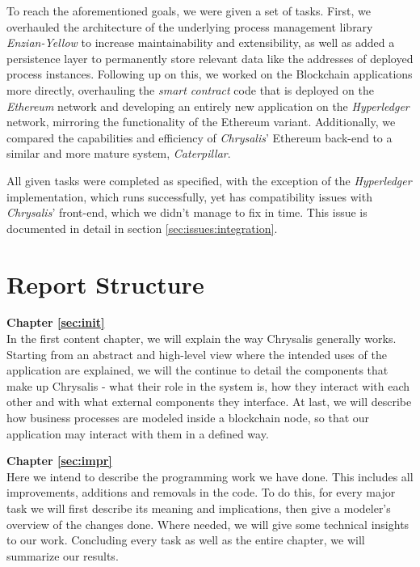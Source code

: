 To reach the aforementioned goals, we were given a set of tasks. First, we overhauled the architecture of the underlying process management library \emph{Enzian-Yellow} to increase maintainability and extensibility, as well as added a persistence layer to permanently store relevant data like the addresses of deployed process instances. Following up on this, we worked on the Blockchain applications more directly, overhauling the \emph{smart contract} code that is deployed on the \emph{Ethereum} network and developing an entirely new application on the \emph{Hyperledger} network, mirroring the functionality of the Ethereum variant. Additionally, we compared the capabilities and efficiency of \emph{Chrysalis}' Ethereum back-end to a similar and more mature system, \emph{Caterpillar}.

All given tasks were completed as specified, with the exception of the \emph{Hyperledger} implementation, which runs successfully, yet has compatibility issues with \emph{Chrysalis}' front-end, which we didn't manage to fix in time. This issue is documented in detail in section \ref{sec:issues:integration}.

\section{Report Structure}
\label{sec:intro:structure}

\textbf{Chapter \ref{sec:init}} \\[0.2em]
In the first content chapter, we will explain the way Chrysalis generally works. Starting from an abstract and high-level view where the intended uses of the application are explained, we will the continue to detail the components that make up Chrysalis - what their role in the system is, how they interact with each other and with what external components they interface. At last, we will describe how business processes are modeled inside a blockchain node, so that our application may interact with them in a defined way.

\textbf{Chapter \ref{sec:impr}} \\[0.2em]
Here we intend to describe the programming work we have done. This includes all improvements, additions and removals in the code. To do this, for every major task we will first describe its meaning and implications, then give a modeler's overview of the changes done. Where needed, we will give some technical insights to our work. Concluding every task as well as the entire chapter, we will summarize our results.

